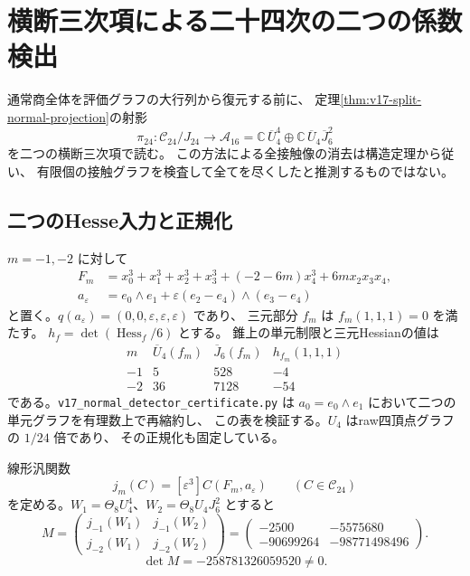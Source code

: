 
\section{横断三次項による二十四次の二つの係数検出}
\label{sec:v17-normal-third-jet-detectors}

通常商全体を評価グラフの大行列から復元する前に、
定理\ref{thm:v17-split-normal-projection}の射影
\[
 \pi_{24}:\mathcal C_{24}/J_{24}\longrightarrow
 \mathcal A_{16}
 =\mathbb C\,\overline U_4^4\oplus
   \mathbb C\,\overline U_4\overline J_6^2
\]
を二つの横断三次項で読む。
この方法による全接触像の消去は構造定理から従い、
有限個の接触グラフを検査して全てを尽くしたと推測するものではない。

\subsection{二つのHesse入力と正規化}

$m=-1,-2$ に対して
\[
\begin{split}
 F_m&=x_0^3+x_1^3+x_2^3+x_3^3+(-2-6m)x_4^3+6m x_2x_3x_4,\\
 a_\varepsilon&=e_0\wedge e_1+
             \varepsilon(e_2-e_4)\wedge(e_3-e_4)
\end{split}
\]
と置く。$q(a_\varepsilon)=(0,0,\varepsilon,\varepsilon,\varepsilon)$ であり、
三元部分 $f_m$ は $f_m(1,1,1)=0$ を満たす。
$h_f=\det(\operatorname{Hess}_f/6)$ とする。
錐上の単元制限と三元Hessianの値は
\[
\begin{array}{c|rrr}
 m&\overline U_4(f_m)&\overline J_6(f_m)&h_{f_m}(1,1,1)\\ \hline
 -1&5&528&-4\\
 -2&36&7128&-54
\end{array}
\]
である。\nolinkurl{v17_normal_detector_certificate.py} は
$a_0=e_0\wedge e_1$ において二つの単元グラフを有理数上で再縮約し、
この表を検証する。$U_4$ はraw四頂点グラフの $1/24$ 倍であり、
その正規化も固定している。

線形汎関数
\[
 j_m(C)=[\varepsilon^3]C(F_m,a_\varepsilon)
 \qquad(C\in\mathcal C_{24})
\]
を定める。$W_1=\Theta_8U_4^4$、$W_2=\Theta_8U_4J_6^2$ とすると
\begin{equation}\label{eq:v17-normal-jet-matrix}
 M=\begin{pmatrix}
 j_{-1}(W_1)&j_{-1}(W_2)\\
 j_{-2}(W_1)&j_{-2}(W_2)
 \end{pmatrix}
 =
 \begin{pmatrix}
 -2500&-5575680\\
 -90699264&-98771498496
 \end{pmatrix}.
\end{equation}
\[
 \det M=-258781326059520\ne0.
\]

